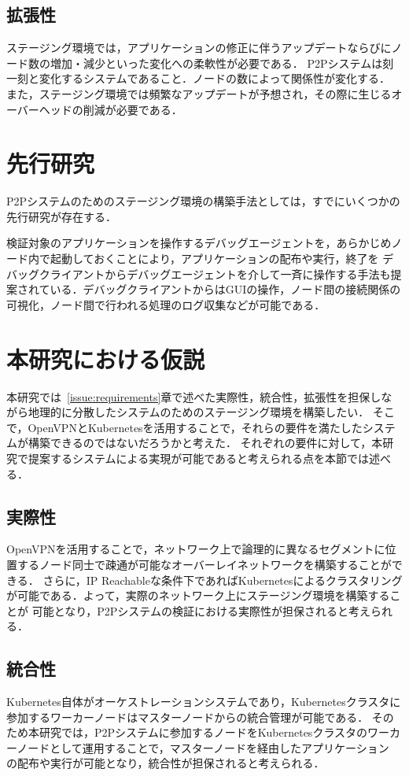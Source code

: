 \subsection{拡張性}
\label{issue:requirements3}
ステージング環境では，アプリケーションの修正に伴うアップデートならびにノード数の増加・減少といった変化への柔軟性が必要である．
P2Pシステムは刻一刻と変化するシステムであること．ノードの数によって関係性が変化する．
また，ステージング環境では頻繁なアップデートが予想され，その際に生じるオーバーヘッドの削減が必要である．

\section{先行研究}
\label{issue:previous-research}
P2Pシステムのためのステージング環境の構築手法としては，すでにいくつかの先行研究が存在する．

検証対象のアプリケーションを操作するデバッグエージェントを，あらかじめノード内で起動しておくことにより，アプリケーションの配布や実行，終了を
デバッグクライアントからデバッグエージェントを介して一斉に操作する手法も提案されている．デバッグクライアントからはGUIの操作，ノード間の接続関係の
可視化，ノード間で行われる処理のログ収集などが可能である．


\section{本研究における仮説}
\label{issue:hypothesis}
本研究では~\ref{issue:requirements}章で述べた実際性，統合性，拡張性を担保しながら地理的に分散したシステムのためのステージング環境を構築したい．
そこで，OpenVPNとKubernetesを活用することで，それらの要件を満たしたシステムが構築できるのではないだろうかと考えた．
それぞれの要件に対して，本研究で提案するシステムによる実現が可能であると考えられる点を本節では述べる．

\subsection{実際性}
OpenVPNを活用することで，ネットワーク上で論理的に異なるセグメントに位置するノード同士で疎通が可能なオーバーレイネットワークを構築することができる．
さらに，IP Reachableな条件下であればKubernetesによるクラスタリングが可能である．よって，実際のネットワーク上にステージング環境を構築することが
可能となり，P2Pシステムの検証における実際性が担保されると考えられる．

\subsection{統合性}
Kubernetes自体がオーケストレーションシステムであり，Kubernetesクラスタに参加するワーカーノードはマスターノードからの統合管理が可能である．
そのため本研究では，P2Pシステムに参加するノードをKubernetesクラスタのワーカーノードとして運用することで，マスターノードを経由したアプリケーション
の配布や実行が可能となり，統合性が担保されると考えられる．

